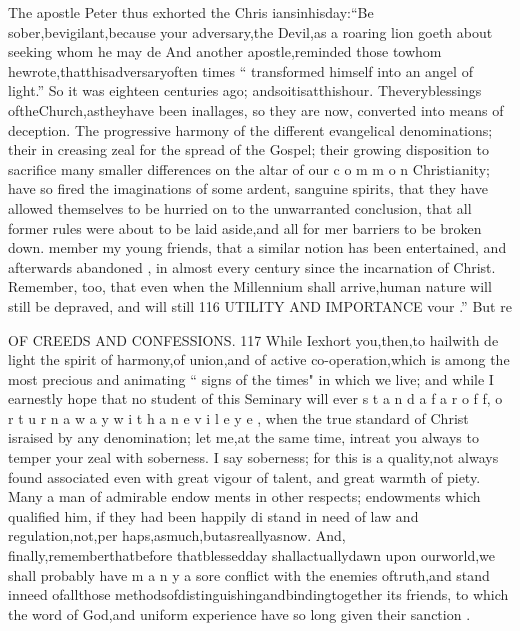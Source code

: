 \documentclass[
]{book}
\begin{document}
The apostle Peter thus exhorted the Chris iansinhisday:``Be sober,bevigilant,because your adversary,the Devil,as a roaring lion goeth about seeking whom he may de
And another apostle,reminded those towhom hewrote,thatthisadversaryoften times `` transformed himself into an angel of light.'' So it was eighteen centuries ago; andsoitisatthishour. Theveryblessings oftheChurch,astheyhave been inallages, so they are now, converted into means of deception. The progressive harmony of the different evangelical denominations; their in creasing zeal for the spread of the Gospel; their growing disposition to sacrifice many smaller differences on the altar of our c o m m o n
Christianity; have so fired the imaginations of some ardent, sanguine spirits, that they have allowed themselves to be hurried on to
the unwarranted conclusion, that all former
rules were about to be laid aside,and all for mer barriers to be broken down.
member my young friends, that a similar notion has been entertained, and afterwards
abandoned , in almost every century since the incarnation of Christ. Remember, too, that
even when the Millennium shall arrive,human nature will still be depraved, and will still
116 UTILITY AND IMPORTANCE
vour
.''
But re

OF CREEDS AND CONFESSIONS. 117
While Iexhort you,then,to hailwith de
light the spirit of harmony,of union,and of
active co-operation,which is among the most precious and animating `` signs of the times" in which we live; and while I earnestly hope
that no student of this Seminary will ever s t a n d a f a r o f f, o r t u r n a w a y w i t h a n e v i l e y e ,
when the true standard of Christ israised by any denomination; let me,at the same time,
intreat you always to temper your zeal with soberness. I say soberness; for this is a
quality,not always found associated even with
great vigour of talent, and great warmth of piety. Many a man of admirable endow
ments in other respects; endowments which qualified him, if they had been happily di
stand in need of law and regulation,not,per haps,asmuch,butasreallyasnow. And, finally,rememberthatbefore thatblessedday
shallactuallydawn upon ourworld,we shall probably have m a n y a sore conflict with the enemies oftruth,and stand inneed ofallthose methodsofdistinguishingandbindingtogether its friends, to which the word of God,and
uniform experience have so long given their sanction .
\end{document}
